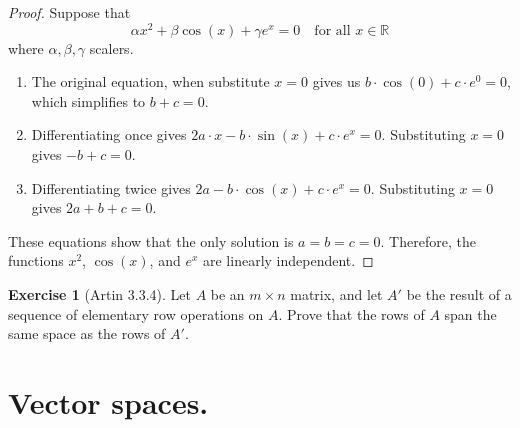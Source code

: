 \documentclass[
]{book}
\providecommand{\tightlist}{%
  \setlength{\itemsep}{0pt}\setlength{\parskip}{0pt}}
\theoremstyle{definition}
\theoremstyle{definition}
\theoremstyle{definition}
\newtheorem{exercise}{Exercise}[chapter]
\theoremstyle{definition}
\theoremstyle{remark}
\begin{document}
\begin{proof}
Suppose that \[\alpha x^2+ \beta \cos(x) +\gamma e^x =0\quad \text{for all } x\in \mathbb{R}\]
where \(\alpha,\beta,\gamma\) scalers.

\begin{enumerate}
\def\labelenumi{\arabic{enumi}.}
\tightlist
\item
  The original equation, when substitute \(x=0\) gives us \(b \cdot \cos(0) + c \cdot e^0 = 0\), which simplifies to \(b + c = 0\).
\item
  Differentiating once gives \(2a \cdot x - b \cdot \sin(x) + c \cdot e^x = 0\). Substituting \(x = 0\) gives \(-b + c = 0\).
\item
  Differentiating twice gives \(2a - b \cdot \cos(x) + c \cdot e^x = 0\). Substituting \(x = 0\) gives \(2a + b + c = 0\).
\end{enumerate}

These equations show that the only solution is \(a = b = c = 0\). Therefore, the functions \(x^2\), \(\cos(x)\), and \(e^x\) are linearly independent.
\end{proof}

\begin{exercise}[Artin 3.3.4]
\protect\hypertarget{exr:unnamed-chunk-297}{}\label{exr:unnamed-chunk-297}Let \(A\) be an \(m \times n\) matrix, and let \(A'\) be the result of a sequence of elementary row operations on \(A\). Prove that the rows of \(A\) span the same space as the rows of \(A'\).
\end{exercise}

\hypertarget{vector-spaces.}{%
\chapter{Vector spaces.}\label{vector-spaces.}}

  
\end{document}
